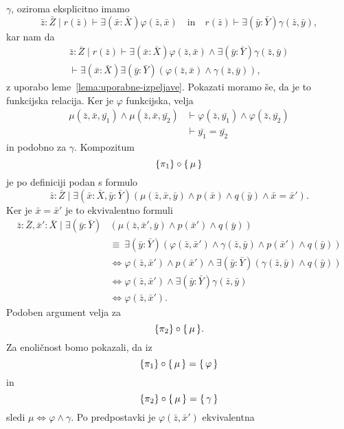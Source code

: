 \documentclass[../kategoricna_logika.tex]{subfiles}
\begin{document}
\begin{dokaz}
\begin{enumerate}[label=(\roman*)]
    $\gamma$, oziroma eksplicitno imamo
    $$\bar{z}:\bar{Z} \mid  r(\bar{z}) \vdash \exists (\bar{x}:\bar{X}) \varphi(\bar{z},\bar{x}) \quad \text{in}\quad
    r(\bar{z}) \vdash \exists (\bar{y}:\bar{Y}) \gamma(\bar{z},\bar{y}),$$
    kar nam da
\begin{multline*}
    \bar{z}:\bar{Z} \mid r(\bar{z}) \vdash \exists (\bar{x}:\bar{X}) \varphi(\bar{z},\bar{x}) \land \exists (\bar{y}:\bar{Y})
    \gamma(\bar{z},\bar{y}) \\
    \vdash \exists (\bar{x}:\bar{X}) \exists (\bar{y}:\bar{Y}) (\varphi(\bar{z},\bar{x}) \land
      \gamma(\bar{z},\bar{y})),
      \end{multline*}
    z uporabo leme~\ref{lema:uporabne-izpeljave}.
    Pokazati moramo še, da je to funkcijska relacija.  Ker je
    $\varphi$ funkcijska, velja
\begin{align*}
    \mu(\bar{z},\bar{x},\bar{y_1}) \land \mu(\bar{z},\bar{x},\bar{y_2}) &\vdash
    \varphi(\bar{z},\bar{y_1}) \land \varphi(\bar{z},\bar{y_2}) \\
    &\vdash  \bar{y_1} = \bar{y_2}
      \end{align*}
    in podobno za $\gamma$.  Kompozitum
    $$\{\pi_1\} \circ \lbrace\,\mu\,\rbrace$$
    je po definiciji podan s formulo
    \[\bar{z}:\bar{Z} \mid  \exists (\bar{x}:\bar{X},\bar{y}:\bar{Y})(\mu(\bar{z},\bar{x},\bar{y}) \land p(\bar{x}) \land q(\bar{y}) \land \bar{x}=\bar{x}').\] Ker
    je $\bar{x} = \bar{x}'$ je to ekvivalentno formuli
    \begin{align*}
      \bar{z}:\bar{Z},\bar{x}':\bar{X} \mid \exists (\bar{y}:\bar{Y}) &(\mu(\bar{z},\bar{x}',\bar{y}) \land p(\bar{x}') \land q(\bar{y})) \\
      &\equiv \ \exists (\bar{y}:\bar{Y})(\varphi(\bar{z},\bar{x}') \land \gamma(\bar{z},\bar{y}) \land p(\bar{x}') \land q(\bar{y})) \\
      &\iff \varphi(\bar{z},\bar{x}') \land p(\bar{x}') \land \exists (\bar{y}:\bar{Y})(\gamma(\bar{z},\bar{y}) \land q(\bar{y})) \\
      &\iff \varphi(\bar{z},\bar{x}') \land \exists (\bar{y}:\bar{Y}) \gamma(\bar{z},\bar{y}) \\
      &\iff \varphi(\bar{z},\bar{x}').
    \end{align*}
    Podoben argument velja za
    $$\{\pi_2\} \circ \lbrace\,\mu\,\rbrace.$$
    Za enoličnost bomo pokazali, da iz
    $$\{\pi_1\} \circ \lbrace\,\mu\,\rbrace = \lbrace\,\varphi\,\rbrace$$
    in
    $$\{\pi_2\} \circ \lbrace\,\mu\,\rbrace = \lbrace\,\gamma\,\rbrace$$
    sledi
    $ \mu \iff \varphi \land \gamma$.  Po
    predpostavki je $\varphi(\bar{z},\bar{x}')$ ekvivalentna

\end{enumerate}
\end{dokaz}
\end{document}
